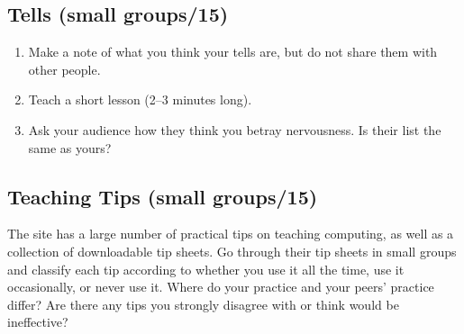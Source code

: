 \subsection*{Tells (small groups/15)}

\begin{enumerate}

\item
  Make a note of what you think your tells are,
  but do not share them with other people.

\item
  Teach a short lesson (2--3 minutes long).

\item
  Ask your audience how they think you betray nervousness.
  Is their list the same as yours?

\end{enumerate}

\subsection*{Teaching Tips (small groups/15)}

The  site
has a large number of practical tips on teaching computing,
as well as a collection of downloadable tip sheets.
Go through their tip sheets in small groups and classify each tip
according to whether you use it all the time,
use it occasionally,
or never use it.
Where do your practice and your peers' practice differ?
Are there any tips you strongly disagree with or think would be ineffective?
